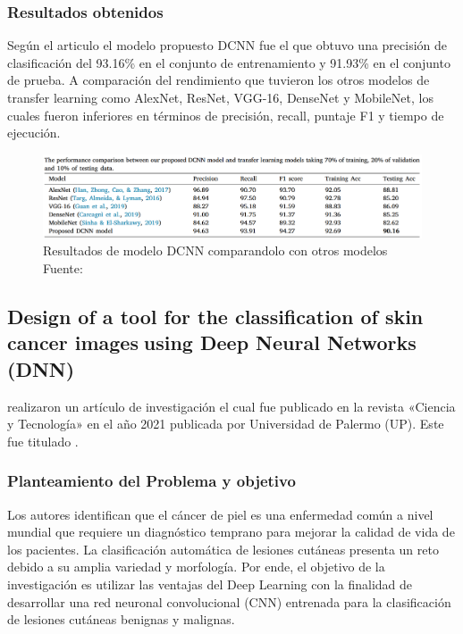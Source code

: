 \subsubsection{Resultados obtenidos}
Según el articulo el modelo propuesto DCNN fue el que obtuvo una precisión de clasificación del 93.16\% en el conjunto de entrenamiento y 91.93\% en el conjunto de prueba. A comparación del rendimiento que tuvieron los otros modelos de transfer learning como AlexNet, ResNet, VGG-16, DenseNet y MobileNet, los cuales fueron inferiores en términos de precisión, recall, puntaje F1 y tiempo de ejecución.

\begin{figure}[h]
	\begin{center}
		\includegraphics[width=1\textwidth]{2/figuras/Problematica_An_enhanced_tecniques_imagen_01.png}
		\caption{Resultados de modelo DCNN comparandolo con otros modelos Fuente: \cite{ali_2021enhanced}}
		\label{1:fig}
	\end{center}
\end{figure}




\subsection{Design of a tool for the classification of skin cancer imagesusing Deep Neural Networks (DNN) \citep*{vargas_2021diseno}}

\citeauthor{vargas_2021diseno} realizaron un artículo de investigación el cual fue publicado en la revista «Ciencia y Tecnología» en el año 2021 publicada por Universidad de Palermo (UP). Este fue titulado .


\subsubsection{Planteamiento del Problema y objetivo}
Los autores identifican que el cáncer de piel es una enfermedad común a nivel mundial que requiere un diagnóstico temprano para mejorar la calidad de vida de los pacientes. La clasificación automática de lesiones cutáneas presenta un reto debido a su amplia variedad y morfología. Por ende, el objetivo de la investigación es utilizar las ventajas del Deep Learning con la finalidad de desarrollar una red neuronal convolucional (CNN) entrenada para la clasificación de lesiones cutáneas benignas y malignas.


